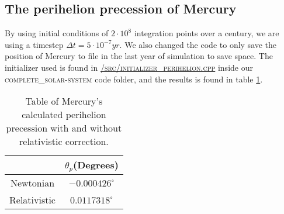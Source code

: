 \documentclass[../main.tex]{subfiles}
\begin{document}
\subsection{The perihelion precession of Mercury}
By using initial conditions of $2 \cdot 10^8$ integration points over a century, we are using a timestep $\Delta t = 5\cdot 10^{-7}yr$. We also changed the code to only save the position of Mercury to file in the last year of simulation to save space. The initializer used is found in \href{https://github.com/kmaasrud/Project-5/blob/master/code/complete_solar-system/src/initialize_perihelion.cpp}{\textsc{/src/initializer\_perihelion.cpp}} inside our \textsc{complete\_solar-system} code folder, and the results is found in table \ref{tab:perihelion}.

\begin{table}[!h]
  \centering
  \caption{Table of Mercury's calculated perihelion precession with and without relativistic correction.}
  \begin{tabular}{c c}
    & $\theta_p$(Degrees)\\
    \hline
    Newtonian &  $-0.000426^\circ$\\
    Relativistic &  $0.0117318^\circ$\\
  \end{tabular}
  \label{tab:perihelion}
\end{table}
\FloatBarrier
\end{document}

